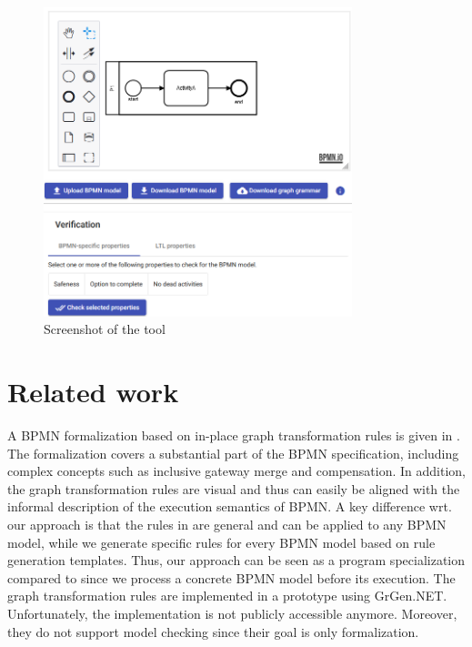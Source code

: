 \documentclass[submission, copyright, creativecommons]{eptcs}
\begin{document}
\begin{figure}[h!]
    \centering
    \includegraphics[width=0.8\textwidth]{images/impl.png}
    \caption{Screenshot of the tool}
    \label{fig:implScreenshot}
\end{figure}

\section{Related work} \label{sec:relatedWork}
A BPMN formalization based on in-place graph transformation rules is given in \cite{vangorpVisualTokenbasedFormalization2013}.
The formalization covers a substantial part of the BPMN specification, including complex concepts such as inclusive gateway merge and compensation.
In addition, the graph transformation rules are visual and thus can easily be aligned with the informal description of the execution semantics of BPMN.
A key difference wrt. our approach is that the rules in \cite{vangorpVisualTokenbasedFormalization2013} are general and can be applied to any BPMN model, while we generate specific rules for every BPMN model based on rule generation templates.
Thus, our approach can be seen as a program specialization compared to \cite{vangorpVisualTokenbasedFormalization2013} since we process a concrete BPMN model before its execution.
The graph transformation rules are implemented in a prototype using GrGen.NET.
Unfortunately, the implementation is not publicly accessible anymore.
Moreover, they do not support model checking since their goal is only formalization.
\end{document}
